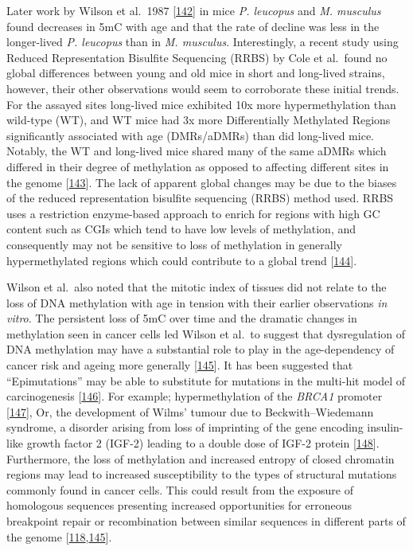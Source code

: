 \documentclass[
]{book}
\begin{document}
Later work by Wilson et al.~1987 {[}\protect\hyperlink{ref-Wilson1987}{142}{]} in mice \emph{P. leucopus} and \emph{M. musculus} found decreases in 5mC with age and that the rate of decline was less in the longer-lived \emph{P. leucopus} than in \emph{M. musculus}.
Interestingly, a recent study using Reduced Representation Bisulfite Sequencing (RRBS) by Cole et al.~found no global differences between young and old mice in short and long-lived strains, however, their other observations would seem to corroborate these initial trends.
For the assayed sites long-lived mice exhibited 10x more hypermethylation than wild-type (WT), and WT mice had 3x more Differentially Methylated Regions significantly associated with age (DMRs/aDMRs) than did long-lived mice.
Notably, the WT and long-lived mice shared many of the same aDMRs which differed in their degree of methylation as opposed to affecting different sites in the genome {[}\protect\hyperlink{ref-Cole2017}{143}{]}.
The lack of apparent global changes may be due to the biases of the reduced representation bisulfite sequencing (RRBS) method used.
RRBS uses a restriction enzyme-based approach to enrich for regions with high GC content such as CGIs which tend to have low levels of methylation, and consequently may not be sensitive to loss of methylation in generally hypermethylated regions which could contribute to a global trend {[}\protect\hyperlink{ref-Meissner2005}{144}{]}.

Wilson et al.~also noted that the mitotic index of tissues did not relate to the loss of DNA methylation with age in tension with their earlier observations \emph{in vitro}.
The persistent loss of 5mC over time and the dramatic changes in methylation seen in cancer cells led Wilson et al.~to suggest that dysregulation of DNA methylation may have a substantial role to play in the age-dependency of cancer risk and ageing more generally {[}\protect\hyperlink{ref-Feinberg2004}{145}{]}.
It has been suggested that ``Epimutations'' may be able to substitute for mutations in the multi-hit model of carcinogenesis {[}\protect\hyperlink{ref-Knudson1971}{146}{]}.
For example; hypermethylation of the \emph{BRCA1} promoter {[}\protect\hyperlink{ref-Esteller2000}{147}{]}, Or, the development of Wilms' tumour due to Beckwith--Wiedemann syndrome, a disorder arising from loss of imprinting of the gene encoding insulin-like growth factor 2 (IGF-2) leading to a double dose of IGF-2 protein {[}\protect\hyperlink{ref-Feinberg2018}{148}{]}.
Furthermore, the loss of methylation and increased entropy of closed chromatin regions may lead to increased susceptibility to the types of structural mutations commonly found in cancer cells.
This could result from the exposure of homologous sequences presenting increased opportunities for erroneous breakpoint repair or recombination between similar sequences in different parts of the genome {[}\protect\hyperlink{ref-Jenkinson2017}{118},\protect\hyperlink{ref-Feinberg2004}{145}{]}.
\end{document}
